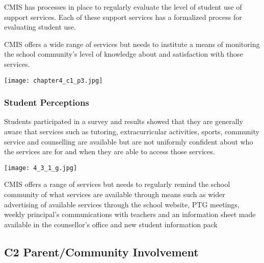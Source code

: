 \begin{findings}

CMIS has processes in place to regularly evaluate the level of student use of support services.  Each of these support services has a formalized process for evaluating student use.


CMIS offers a wide range of services but needs to institute a means of monitoring the school community’s level of knowledge about and satisfaction with those services.
\end{findings}

{\centering\texttt{[image: chapter4\_c1\_p3.jpg]}}

\subsubsection{Student Perceptions}



\begin{findings}
Students participated in a survey and results showed that they are generally aware that services such as tutoring, extracurricular activities, sports, community service and counselling are available but are not uniformly confident about who the services are for and when they are able to access those services.

{\centering\texttt{[image: 4\_3\_1\_g.jpg]}}


CMIS offers a range of services but needs to regularly remind the school community of what services are available through means such as wider advertising of available services through the school website, PTG meetings, weekly principal’s communications with teachers and an information sheet made available in the counsellor’s office and new student information pack
\end{findings}

\subsection{C2 Parent/Community Involvement}

